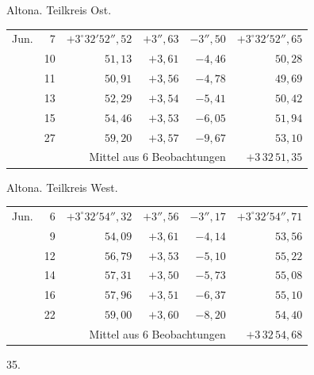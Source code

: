 \noindent\begin{minipage}[t]{.495\textwidth}\centering Altona. Teilkreis Ost.\par\smallskip
{\scriptsize\setlength{\tabcolsep}{1pt}\renewcommand{\arraystretch}{1.2}\begin{tabular}{lr|r|r|r|r|}
Jun.&7&$+3^\circ32'52''{,}52$&$+3''{,}63$&$-3''{,}50$&$+3^\circ32'52''{,}65$\\
&10&$51{,}13$&$+3{,}61$&$-4{,}46$&$50{,}28$\\
&11&$50{,}91$&$+3{,}56$&$-4{,}78$&$49{,}69$\\
&13&$52{,}29$&$+3{,}54$&$-5{,}41$&$50{,}42$\\
&15&$54{,}46$&$+3{,}53$&$-6{,}05$&$51{,}94$\\
&27&$59{,}20$&$+3{,}57$&$-9{,}67$&$53{,}10$\\
\cline{6-6}\multicolumn{5}{r}{Mittel aus 6 Beobachtungen}&$+3\,32\,51{,}35$
\end{tabular}}\end{minipage}\hfill\begin{minipage}[t]{.495\textwidth}\centering Altona. Teilkreis West.\par\smallskip
{\scriptsize\setlength{\tabcolsep}{1pt}\renewcommand{\arraystretch}{1.2}\begin{tabular}{lr|r|r|r|r}
Jun.&6&$+3^\circ32'54''{,}32$&$+3''{,}56$&$-3''{,}17$&$+3^\circ32'54''{,}71$\\
&9&$54{,}09$&$+3{,}61$&$-4{,}14$&$53{,}56$\\
&12&$56{,}79$&$+3{,}53$&$-5{,}10$&$55{,}22$\\
&14&$57{,}31$&$+3{,}50$&$-5{,}73$&$55{,}08$\\
&16&$57{,}96$&$+3{,}51$&$-6{,}37$&$55{,}10$\\
&22&$59{,}00$&$+3{,}60$&$-8{,}20$&$54{,}40$\\
\cline{6-6}\multicolumn{5}{r}{Mittel aus 6 Beobachtungen}&$+3\,32\,54{,}68$
\end{tabular}}\end{minipage}
\par\vspace{4mm}
\begin{center}35.\end{center}

